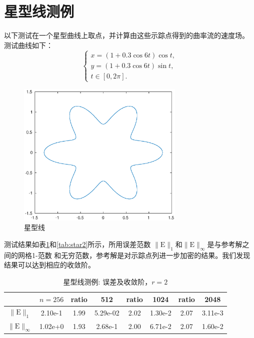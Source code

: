 \documentclass[a4paper,twoside]{ctexart}
\begin{document}
  \section{星型线测例}

以下测试在一个星型曲线上取点，并计算由这些示踪点得到的曲率流的速度场。
测试曲线如下：
\begin{equation}
  \left\{
  \begin{array}{l}
    x=(1+0.3\cos{6t})\cos{t},\\
    y=(1+0.3\cos{6t})\sin{t},\\
    t \in [0,2\pi].
  \end{array}
  \right.
\end{equation}

\begin{figure}[!htp]                                                                       
  \centering                                                                           
  \includegraphics[width=8cm]{star.eps}                                           
  \caption{星型线}                        
\end{figure}

\newpage 测试结果如表\ref{tab:star1}和\ref{tab:star2}所示，所用误差范数
$\|\mathrm{E}\|_1$和$\|\mathrm{E}\|_{\infty}$是与参考解之间的网格1-范数
和无穷范数，参考解是对示踪点列进一步加密的结果。我们发现结果可以达到相应的收敛阶。

\begin{table}[htbp]
    \centering\begin{tabular}{c|ccccccc}
        \hline
         &$n=256$&ratio&512&ratio&1024&ratio&2048\\
        \hline
        $\|\mathrm{E}\|_1$&2.10e-1&1.99&5.29e-02&2.02&1.30e-2&2.07&3.11e-3\\
        \hline
        $\|\mathrm{E}\|_{\infty}$&1.02e+0&1.93&2.68e-1&2.00&6.71e-2&2.07&1.60e-2\\
        \hline
    \end{tabular}
    \caption{星型线测例: 误差及收敛阶，$r = 2$}
    \label{tab:star1}
  \end{table}
\end{document}
